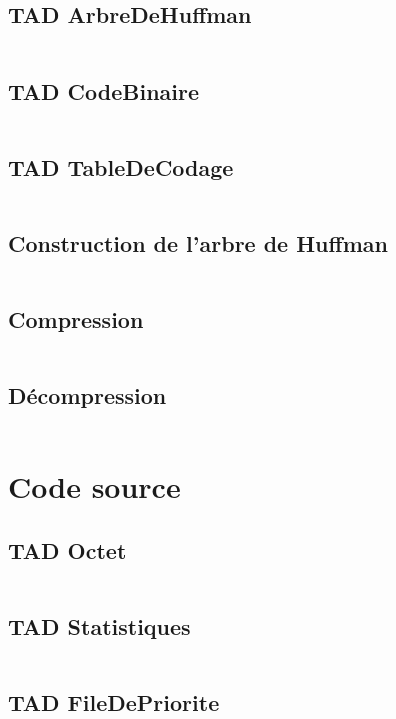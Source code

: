 \documentclass[10pt]{report}
\begin{document}
            \subsection{TAD ArbreDeHuffman}
                \inputminted[breaklines]{c}{../include/arbreDeHuffman.h}
            \subsection{TAD CodeBinaire}
                \inputminted[breaklines]{c}{../include/codeBinaire.h}
            \subsection{TAD TableDeCodage}
                \inputminted[breaklines]{c}{../include/tableDeCodage.h}
            \subsection{Construction de l'arbre de Huffman}
                \inputminted[breaklines]{c}{../include/construireArbreDeHuffman.h}
            \subsection{Compression}
                \inputminted[breaklines]{c}{../include/compression.h}
            \subsection{Décompression}
                \inputminted[breaklines]{c}{../include/decompression.h} 

        \newpage
        \section{Code source}
            \subsection{TAD Octet}
                \inputminted[breaklines]{c}{../src/octet.c}
            \subsection{TAD Statistiques}
                \inputminted[breaklines]{c}{../src/statistiques.c}
            \subsection{TAD FileDePriorite}
                \inputminted[breaklines]{c}{../src/fileDePrioriteDArbreDeHuffman.c}
\end{document}
